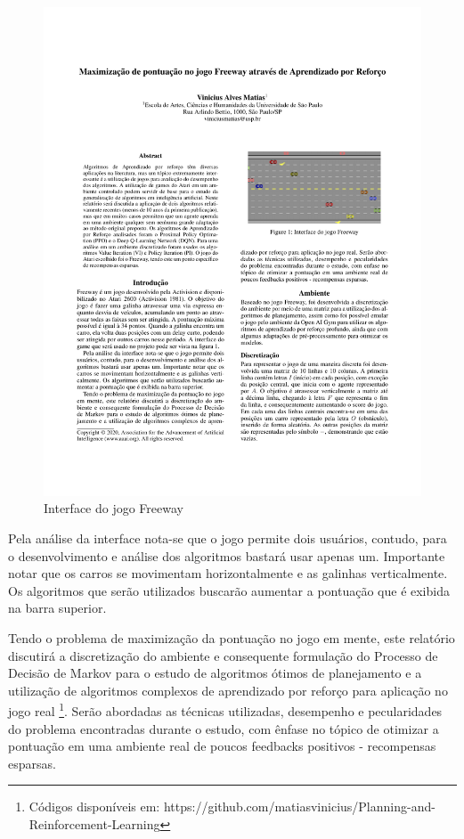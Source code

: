 \documentclass[letterpaper]{article} %
\begin{document}
\begin{figure}[h]
\centering
\includegraphics[width=0.9\columnwidth]{freeway}
\caption{Interface do jogo Freeway}
\label{freeway}
\end{figure}

Pela análise da interface nota-se que o jogo permite dois usuários, contudo, para o desenvolvimento e análise dos algoritmos bastará usar apenas um. Importante notar que os carros se movimentam horizontalmente e as galinhas verticalmente. Os algoritmos que serão utilizados buscarão aumentar a pontuação que é exibida na barra superior.

Tendo o problema de maximização da pontuação no jogo em mente, este relatório discutirá a discretização do ambiente e consequente formulação do Processo de Decisão de Markov para o estudo de algoritmos ótimos de planejamento e a utilização de algoritmos complexos de aprendizado por reforço para aplicação no jogo real \footnote{Códigos disponíveis em: https://github.com/matiasvinicius/Planning-and-Reinforcement-Learning}. Serão abordadas as técnicas utilizadas, desempenho e pecularidades do problema encontradas durante o estudo, com ênfase no tópico de otimizar a pontuação em uma ambiente real de poucos feedbacks positivos - recompensas esparsas.
\end{document}

